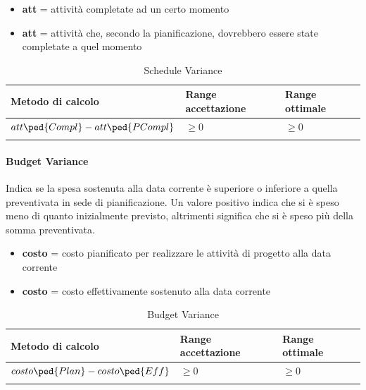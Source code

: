 				\begin{itemize}
				\item \textbf{att} = attività completate ad un certo momento
				\item \textbf{att} = attività che, secondo la pianificazione, dovrebbero essere state completate a quel momento
			\end{itemize}
			
			\begin{longtable}{>{\centering\arraybackslash}p{5cm}|>{\centering\arraybackslash}p{5cm} | >{\centering\arraybackslash}p{5cm}}
					\hline
					\rowcolor{Gray}
					\textbf{Metodo di calcolo} & \textbf{Range accettazione} & \textbf{Range ottimale} \\
					\hline
					\begin{math}
					{att\ped{Compl} - att\ped{PCompl}}
					\end{math}  &  \begin{math}\geq{0} \end{math}  &  \begin{math}\geq{0} \end{math} 
				\\
				\caption{Schedule Variance}
			\end{longtable}
		
		\paragraph{Budget Variance}
		Indica se la spesa sostenuta alla data corrente è superiore o inferiore a quella preventivata in sede di pianificazione.
		Un valore positivo indica che si è speso meno di quanto inizialmente previsto, altrimenti significa che si è speso più della somma preventivata.
		
		\begin{itemize}
			\item \textbf{costo} = costo pianificato per realizzare le attività di progetto alla data corrente
			\item \textbf{costo} = costo effettivamente sostenuto alla data corrente
		\end{itemize}
		\vspace{1.3cm}
		\begin{longtable}{>{\centering\arraybackslash}p{5cm}|>{\centering\arraybackslash}p{5cm} | >{\centering\arraybackslash}p{5cm}}
				\hline
				\rowcolor{Gray}
				\textbf{Metodo di calcolo} & \textbf{Range accettazione} & \textbf{Range ottimale} \\
				\hline
				\begin{math}
				{costo\ped{Plan} - costo\ped{Eff}}
				\end{math} & \begin{math}\geq{0} \end{math}  & \begin{math}\geq{0} \end{math}
			\\
			\caption{Budget Variance}
		\end{longtable}
		
